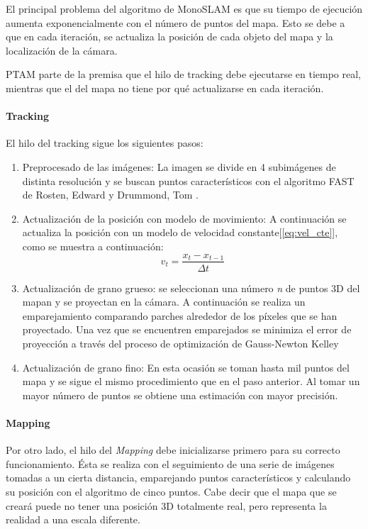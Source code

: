 \documentclass{bmvc2k}
\begin{document}
El principal problema del algoritmo de MonoSLAM es que su tiempo de ejecución aumenta exponencialmente con el número de puntos del mapa. Esto se debe a que en cada iteración, se actualiza la posición de cada objeto del mapa y la localización de la cámara. 

PTAM parte de la premisa que el hilo de tracking debe ejecutarse en tiempo real, mientras que el del mapa no tiene por qué actualizarse en cada iteración. 

\paragraph{Tracking}
El hilo del tracking sigue los siguientes pasos:
\begin{enumerate}
	\item Preprocesado de las imágenes: La imagen se divide en 4 subimágenes de distinta resolución y se buscan puntos característicos con el algoritmo FAST de Rosten, Edward y Drummond, Tom \cite{Rosten:2006}.
	\item Actualización de la posición con modelo de movimiento: A continuación se actualiza la posición con un modelo de velocidad constante[\ref{eq:vel_cte}], como se muestra a continuación:
	\begin{equation}\label{eq:vel_cte}
	v_{t}=\frac{x_{t}-x_{t-1}}{\Delta t}
	\end{equation}
	\item Actualización de grano grueso: se seleccionan una número \textit{n} de puntos 3D del mapan y se proyectan en la cámara. A continuación se realiza un emparejamiento comparando parches alrededor de los píxeles que se han proyectado. Una vez que se encuentren emparejados se minimiza el error de proyección a través del proceso de optimización de Gauss-Newton Kelley \cite{Gauss-Newton}
	\item Actualización de grano fino: En esta ocasión se toman hasta mil puntos del mapa y se sigue el mismo procedimiento que en el paso anterior. Al tomar un mayor número de puntos se obtiene una estimación con mayor precisión.

\end{enumerate}
\paragraph{Mapping}
Por otro lado, el hilo del \textit{Mapping} debe inicializarse primero para su correcto funcionamiento. Ésta se realiza con el seguimiento de una serie de imágenes tomadas a un cierta distancia, emparejando puntos característicos y calculando su posición con el algoritmo de cinco puntos. Cabe decir que el mapa que se creará puede no tener una posición 3D totalmente real, pero representa la realidad a una escala diferente.
\end{document}
